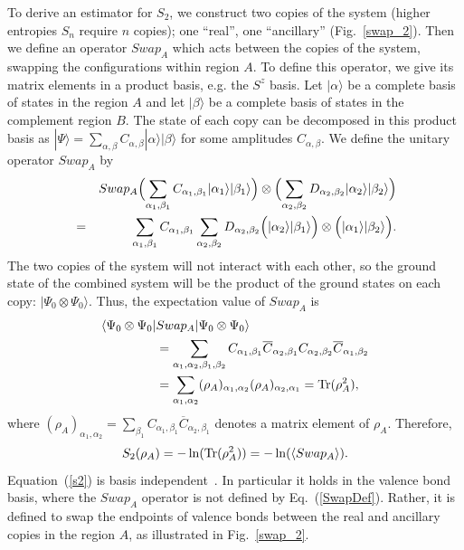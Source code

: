 \documentclass[prl,aps,twocolumn,floatfix,amsmath,amssymb,superscriptaddress,tightenlines]{revtex4}
\begin{document}
%
%
To derive an estimator for $S_2$, we construct two copies of the
system (higher entropies $S_n$ require $n$ copies);
one ``real'', one ``ancillary'' (Fig.~\ref{swap_2}). Then we define an
operator $Swap_A$ which acts between the copies of the system, swapping
the configurations within region $A$.  To define this operator, we
give its matrix elements in a product basis, e.g.  the
$S^z$ basis.  Let $|\alpha\rangle$  be a complete basis of states in the
region $A$ and let $|\beta\rangle$ be a complete basis of states in the
complement region $B$. The state of each copy can be decomposed
in this product basis as $|\Psi\rangle=\sum_{\alpha,\beta} C_{\alpha,\beta}
|\alpha\rangle | \beta \rangle$ for some amplitudes $C_{\alpha,\beta}$.
We define the unitary operator $Swap_A$ by
\begin{eqnarray}
\label{SwapDef}
&& Swap_A  \Bigl( \sum_{\alpha_1,\beta_1} C_{\alpha_1,\beta_1}|\alpha_1\rangle |\beta_1\rangle \Bigr) \otimes
\Bigl( \sum_{\alpha_2,\beta_2} D_{\alpha_2,\beta_2}|\alpha_2\rangle
|\beta_2\rangle \Bigr) \nonumber\\ &=&
\sum_{\alpha_1,\beta_1} C_{\alpha_1,\beta_1}
\sum_{\alpha_2,\beta_2} D_{\alpha_2,\beta_2}
\Bigl( |\alpha_2\rangle |\beta_1\rangle \Bigr) \otimes
\Bigl( |\alpha_1\rangle |\beta_2\rangle \Bigr).
\end{eqnarray}
The two copies of the system will not interact with each other, so the
ground state of the combined system will be the product of the ground states
on each copy:
$|\Psi_0\otimes \Psi_0\rangle$.  Thus, the expectation value
of $Swap_A$ is
\begin{align}
\label{H2fromSwap}
 \langle \Psi_0\otimes \Psi_0| & Swap_A|\Psi_0\otimes \Psi_0\rangle
\nonumber \\ 
&= 
\sum_{\alpha_1,\alpha_2,\beta_1,\beta_2} C_{\alpha_1,\beta_1} \overline C_{\alpha_2,\beta_1} C_{\alpha_2,\beta_2} \overline C_{\alpha_1,\beta_2}
\nonumber \\
&=
\sum_{\alpha_1,\alpha_2} (\rho_A)_{\alpha_1,\alpha_2}
(\rho_A)_{\alpha_2,\alpha_1}={\rm Tr}(\rho_A^2),
\end{align}
where $(\rho_A)_{\alpha_1,\alpha_2}=\sum_{\beta_1}C_{\alpha_1,\beta_1} \overline C_{\alpha_2,\beta_1}$
denotes a matrix element of $\rho_A$. Therefore, 
\begin{equation} 
\label{s2}
S_2(\rho_A) =-\ln({\rm Tr}(\rho_A^2))=-\ln(\langle Swap_A \rangle). 
\end{equation}
Equation~(\ref{s2}) is basis independent~\cite{Jaeger}. In particular it
holds in the valence bond basis, where the $Swap_A$ operator is not
defined by Eq.~(\ref{SwapDef}). Rather, it is defined to swap the
endpoints of valence bonds between the real and ancillary copies in the
region $A$, as illustrated in Fig.~\ref{swap_2}.  
\end{document}
